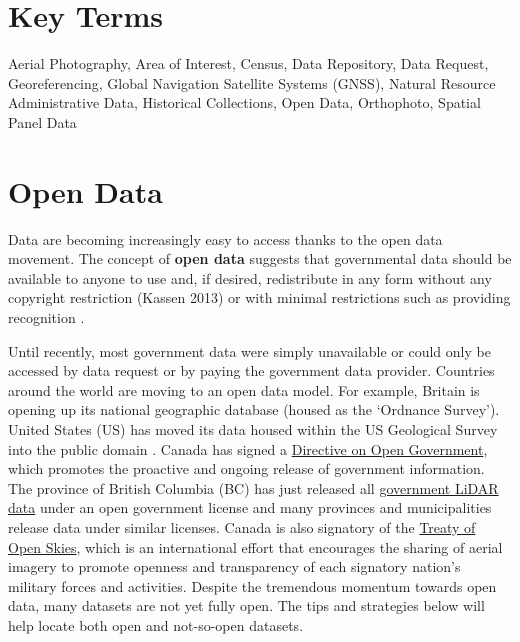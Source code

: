 \documentclass[
]{book}
\begin{document}
\hypertarget{key-terms-3}{%
\section*{Key Terms}\label{key-terms-3}}

Aerial Photography, Area of Interest, Census, Data Repository, Data Request, Georeferencing, Global Navigation Satellite Systems (GNSS), Natural Resource Administrative Data, Historical Collections, Open Data, Orthophoto, Spatial Panel Data

\hypertarget{open-data}{%
\section{Open Data}\label{open-data}}

Data are becoming increasingly easy to access thanks to the open data movement. The concept of \textbf{open data} suggests that governmental data should be available to anyone to use and, if desired, redistribute in any form without any copyright restriction (Kassen 2013) or with minimal restrictions such as providing recognition \citep{kassen_promising_2013}.

Until recently, most government data were simply unavailable or could only be accessed by data request or by paying the government data provider. Countries around the world are moving to an open data model. For example, Britain is opening up its national geographic database (housed as the `Ordnance Survey'). United States (US) has moved its data housed within the US Geological Survey into the public domain \citep{usgs_copyrights_nodate}. Canada has signed a \href{https://www.tbs-sct.gc.ca/pol/doc-eng.aspx?id=28108}{Directive on Open Government}, which promotes the proactive and ongoing release of government information. The province of British Columbia (BC) has just released all \href{https://governmentofbc.maps.arcgis.com/apps/MapSeries/index.html?appid=d06b37979b0c4709b7fcf2a1ed458e03}{government LiDAR data} under an open government license and many provinces and municipalities release data under similar licenses. Canada is also signatory of the \href{https://en.wikipedia.org/wiki/Treaty_on_Open_Skies}{Treaty of Open Skies}, which is an international effort that encourages the sharing of aerial imagery to promote openness and transparency of each signatory nation's military forces and activities. Despite the tremendous momentum towards open data, many datasets are not yet fully open. The tips and strategies below will help locate both open and not-so-open datasets.
\end{document}
